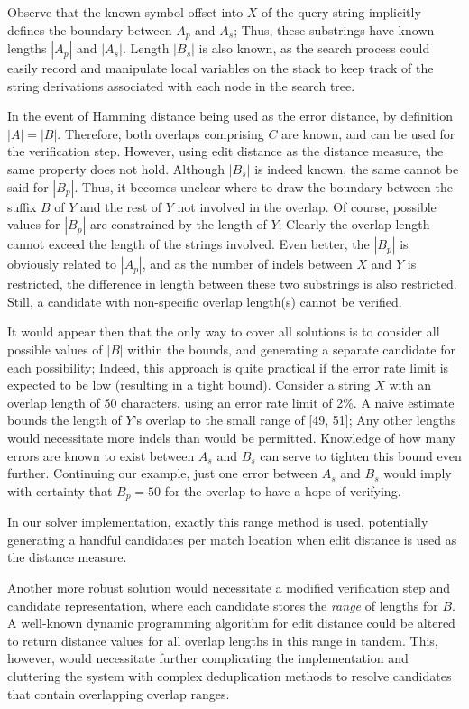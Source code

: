 Observe that the known symbol-offset into $X$ of the query string implicitly defines the boundary between $A_p$ and $A_s$; Thus, these substrings have known lengths $|A_p|$ and $|A_s|$. Length $|B_s|$ is also known, as the search process could easily record and manipulate local variables on the stack to keep track of the string \glspl{derivation} associated with each node in the search tree.


In the event of \gls{Hamming distance} being used as the \gls{error distance}, by definition $|A|=|B|$. Therefore, both overlaps comprising $C$ are known, and can be used for the \gls{verification step}. However, using \gls{edit distance} as the distance measure, the same property does not hold. Although $|B_s|$ is indeed known, the same cannot be said for $|B_p|$. Thus, it becomes unclear where to draw the boundary between the suffix $B$ of $Y$ and the rest of $Y$ not involved in the overlap. Of course, possible values for $|B_p|$ are constrained by the length of $Y$; Clearly the overlap length cannot exceed the length of the strings involved. Even better, the $|B_p|$ is obviously related to $|A_p|$, and as the number of indels between $X$ and $Y$ is restricted, the difference in length between these two substrings is also restricted. Still, a candidate with non-specific overlap length(s) cannot be verified.

It would appear then that the only way to cover all solutions is to consider all possible values of $|B|$ within the bounds, and generating a separate candidate for each possibility; Indeed, this approach is quite practical if the \gls{error rate} limit is expected to be low (resulting in a tight bound). Consider a string $X$ with an overlap length of 50 characters, using an error rate limit of 2\%. A naive estimate bounds the length of $Y$'s overlap to the small range of [49, 51]; Any other lengths would necessitate more \glspl{indel} than would be permitted. Knowledge of how many errors are known to exist between $A_s$ and $B_s$ can serve to tighten this bound even further. Continuing our example, just one error between $A_s$ and $B_s$ would imply with certainty that $B_p=50$ for the overlap to have a hope of verifying.

In our \aspop{} solver implementation, exactly this range method is used, potentially generating a handful candidates per \gls{match location} when edit distance is used as the distance measure.
 
Another more robust solution would necessitate a modified \gls{verification step} and candidate representation, where each candidate stores the \textit{range} of lengths for $B$. A well-known dynamic programming algorithm for edit distance could be altered to return distance values for all overlap lengths in this range in tandem. This, however, would necessitate further complicating the implementation and cluttering the system with complex deduplication methods to resolve candidates that contain overlapping overlap ranges.




